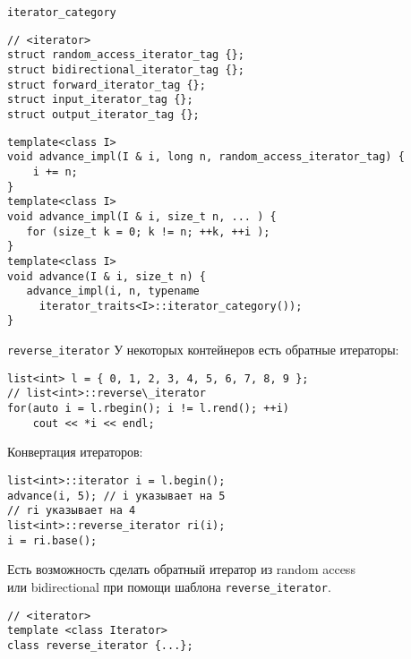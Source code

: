 \documentclass{beamer}
\begin{document}
\begin{frame}[fragile]{{\tt iterator\_category}}
\begin{lstlisting}
// <iterator>
struct random_access_iterator_tag {};
struct bidirectional_iterator_tag {};
struct forward_iterator_tag {};
struct input_iterator_tag {};
struct output_iterator_tag {};
\end{lstlisting}
\begin{lstlisting}
template<class I>
void advance_impl(I & i, long n, random_access_iterator_tag) { 
    i += n; 
}
template<class I>
void advance_impl(I & i, size_t n, ... ) { 
   for (size_t k = 0; k != n; ++k, ++i );
}
template<class I>
void advance(I & i, size_t n) {
   advance_impl(i, n, typename 
     iterator_traits<I>::iterator_category());
}
\end{lstlisting}
\end{frame}

\begin{frame}[fragile]{{\tt reverse\_iterator}}
    У некоторых контейнеров есть обратные итераторы: 
\begin{lstlisting}
list<int> l = { 0, 1, 2, 3, 4, 5, 6, 7, 8, 9 }; 
// list<int>::reverse\_iterator
for(auto i = l.rbegin(); i != l.rend(); ++i)
    cout << *i << endl;
\end{lstlisting}

Конвертация итераторов:
\begin{lstlisting}
list<int>::iterator i = l.begin();
advance(i, 5); // i указывает на 5
// ri указывает на 4
list<int>::reverse_iterator ri(i); 
i = ri.base();
\end{lstlisting}

Есть возможность сделать обратный итератор из random access\\ или bidirectional при помощи шаблона 
\texttt{reverse\_iterator}.
\begin{lstlisting}
// <iterator>
template <class Iterator> 
class reverse_iterator {...};
\end{lstlisting}
\end{frame}
\end{document}
